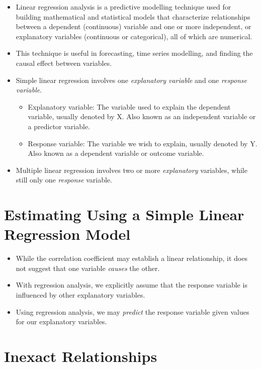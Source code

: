 \documentclass[
  letterpaper,
  DIV=11,
  numbers=noendperiod]{scrreprt}
\providecommand{\tightlist}{%
  \setlength{\itemsep}{0pt}\setlength{\parskip}{0pt}}\usepackage{longtable,booktabs,array}
\begin{document}
\begin{itemize}
\tightlist
\item
  Linear regression analysis is a predictive modelling technique used
  for building mathematical and statistical models that characterize
  relationships between a dependent (continuous) variable and one or
  more independent, or explanatory variables (continuous or
  categorical), all of which are numerical.
\item
  This technique is useful in forecasting, time series modelling, and
  finding the causal effect between variables.
\item
  Simple linear regression involves one \emph{explanatory variable} and
  one \emph{response variable}.

  \begin{itemize}
  \tightlist
  \item
    Explanatory variable: The variable used to explain the dependent
    variable, usually denoted by X. Also known as an independent
    variable or a predictor variable.
  \item
    Response variable: The variable we wish to explain, usually denoted
    by Y. Also known as a dependent variable or outcome variable.
  \end{itemize}
\item
  Multiple linear regression involves two or more \emph{explanatory}
  variables, while still only one \emph{response} variable.
\end{itemize}

\section{Estimating Using a Simple Linear Regression
Model}\label{estimating-using-a-simple-linear-regression-model}

\begin{itemize}
\tightlist
\item
  While the correlation coefficient may establish a linear relationship,
  it does not suggest that one variable \emph{causes} the other.
\item
  With regression analysis, we explicitly assume that the response
  variable is influenced by other explanatory variables.
\item
  Using regression analysis, we may \emph{predict} the response variable
  given values for our explanatory variables.
\end{itemize}

\section{Inexact Relationships}\label{inexact-relationships}
\end{document}
